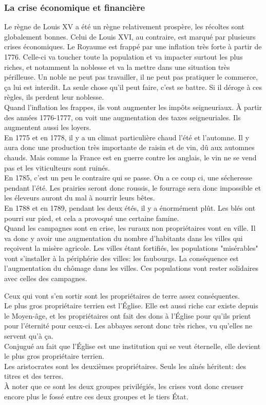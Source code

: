 \documentclass[10pt, a4paper, openany]{book}
\begin{document}
\subsubsection{La crise économique et financière}

Le règne de Louis XV a été un règne relativement prospère, les récoltes sont globalement bonnes. Celui de Louis XVI, au contraire, est marqué par plusieurs crises économiques. Le Royaume est frappé par une inflation très forte à partir de 1776. Celle-ci va toucher toute la population et va impacter surtout les plus riches, et notamment la noblesse et va la mettre dans une situation très périlleuse. Un noble ne peut pas travailler, il ne peut pas pratiquer le commerce, ça lui est interdit. La seule chose qu'il peut faire, c'est se battre. Si il déroge à ces règles, ils perdent leur noblesse. \\
Quand l'inflation les frappes, ils vont augmenter les impôts seigneuriaux. À partir des années 1776-1777, on voit une augmentation des taxes seigneuriales. Ils augmentent aussi les loyers. \\
En 1775 et en 1778, il y a un climat particulière chaud l'été et l'automne. Il y aura donc une production très importante de raisin et de vin, dû aux automnes chauds. Mais comme la France est en guerre contre les anglais, le vin ne se vend pas et les viticulteurs sont ruinés. \\
En 1785, c'est un peu le contraire qui se passe. On a ce coup ci, une sécheresse pendant l'été. Les prairies seront donc roussis, le fourrage sera donc impossible et les éleveurs auront du mal à nourrir leurs bêtes. \\
En 1788 et en 1789, pendant les deux étés, il y a énormément plût. Les blés ont pourri sur pied, et cela a provoqué une certaine famine. \\
Quand les campagnes sont en crise, les ruraux non propriétaires vont en ville. Il va donc y avoir une augmentation du nombre d'habitants dans les villes qui reçoivent la misère agricole. Les villes étant fortifiés, les populations "misérables" vont s'installer à la périphérie des villes: les faubourgs. La conséquence est l'augmentation du chômage dans les villes. Ces populations vont rester solidaires avec celles des campagnes. 


Ceux qui vont s'en sortir sont les propriétaires de terre assez conséquentes. \\
Le plus gros propriétaire terrien est l'Église. Elle est aussi riche car existe depuis le Moyen-âge, et les propriétaires ont fait des dons à l'Église pour qu'ils prient pour l'éternité pour ceux-ci. Les abbayes seront donc très riches, vu qu'elles ne servent qu'à ça. \\
Conjugué au fait que l'Église est une institution qui se veut éternelle, elle devient le plus gros propriétaire terrien. \\
Les aristocrates sont les deuxièmes propriétaires. Seuls les aînés héritent: des titres et des terres. \\
À noter que ce sont les deux groupes privilégiés, les crises vont donc creuser encore plus le fossé entre ces deux groupes et le tiers État. 
\end{document}
